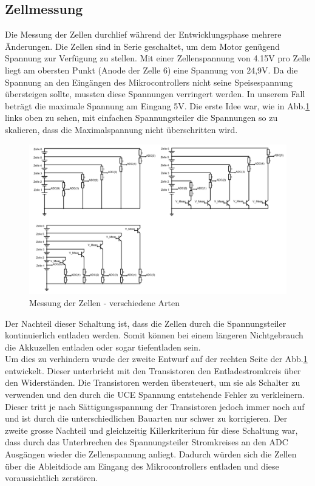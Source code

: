 \subsection*{Zellmessung}
Die Messung der Zellen durchlief während der Entwicklungsphase mehrere Änderungen. Die Zellen sind in Serie geschaltet, um dem Motor genügend Spannung zur Verfügung zu stellen. Mit einer Zellenspannung von 4.15V pro Zelle liegt am obersten Punkt (Anode der Zelle 6) eine Spannung von 24,9V. Da die Spannung an den Eingängen des Mikrocontrollers nicht seine Speisespannung übersteigen sollte, mussten diese Spannungen verringert werden. In unserem Fall beträgt die maximale Spannung am Eingang 5V. Die erste Idee war, wie in Abb.\ref{fig:zellmessung} links oben zu sehen, mit einfachen Spannungsteiler die Spannungen so zu skalieren, dass die Maximalspannung nicht überschritten wird. 
\begin{figure} [H]
	\centering
	\includegraphics[width=1\linewidth]{images/Zellmessung}
	\caption{Messung der Zellen - verschiedene Arten}
	\label{fig:zellmessung}
\end{figure}
Der Nachteil dieser Schaltung ist, dass die Zellen durch die Spannungsteiler kontinuierlich entladen werden. Somit können bei einem längeren Nichtgebrauch die Akkuzellen entladen oder sogar tiefentladen sein. \\
Um dies zu verhindern wurde der zweite Entwurf auf der rechten Seite der Abb.\ref{fig:zellmessung} entwickelt. Dieser unterbricht mit den Transistoren den Entladestromkreis über den Widerständen. Die Transistoren werden übersteuert, um sie als Schalter zu verwenden und den durch die UCE  Spannung entstehende Fehler zu verkleinern. Dieser tritt je nach Sättigungsspannung der Transistoren jedoch immer noch auf und ist durch die unterschiedlichen Bauarten nur schwer zu korrigieren. Der zweite grosse Nachteil und gleichzeitig Killerkriterium für diese Schaltung war, dass durch das Unterbrechen des Spannungsteiler Stromkreises an den ADC Ausgängen wieder die Zellenspannung anliegt. Dadurch würden sich die Zellen über die Ableitdiode am Eingang des Mikrocontrollers entladen und diese  voraussichtlich zerstören. \\
